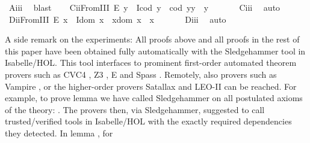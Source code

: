 \begin{isabellebody}
\ A\isactrlsub i\isactrlsub i\isactrlsub i\ \isamarkupfalse%
\ blast%
\endisatagproof
{\isafoldproof}%
%
\isadelimproof
\isanewline
%
\endisadelimproof
\ \ \isamarkupfalse%
\ C\isactrlsub i\isactrlsub iFromIII{\isacharcolon}\ {\isachardoublequoteopen}E\ y\ \isactrlbold {\isasymrightarrow}\ {\isacharparenleft}I{\isacharparenleft}cod\ y{\isacharparenright}\ \isactrlbold {\isasymand}\ {\isacharparenleft}cod\ y{\isacharparenright}{\isasymcdot}y\ {\isasymcong}\ y{\isacharparenright}{\isachardoublequoteclose}\ \isanewline
%
\isadelimproof
\ \ \ \ %
\endisadelimproof
%
\isatagproof
{}\isamarkupfalse%
\ C\isactrlsub i\isactrlsub i\isactrlsub i\ \isamarkupfalse%
\ auto%
\endisatagproof
{\isafoldproof}%
%
\isadelimproof
\isanewline
%
\endisadelimproof
\ \ \isamarkupfalse%
\ D\isactrlsub i\isactrlsub iFromIII{\isacharcolon}\ {\isachardoublequoteopen}E\ x\ \isactrlbold {\isasymrightarrow}\ {\isacharparenleft}I{\isacharparenleft}dom\ x{\isacharparenright}\ \isactrlbold {\isasymand}\ x{\isasymcdot}{\isacharparenleft}dom\ x{\isacharparenright}\ {\isasymcong}\ x{\isacharparenright}{\isachardoublequoteclose}\ \isanewline
%
\isadelimproof
\ \ \ \ %
\endisadelimproof
%
\isatagproof
{}\isamarkupfalse%
\ D\isactrlsub i\isactrlsub i\isactrlsub i\ \isamarkupfalse%
\ auto%
\endisatagproof
{\isafoldproof}%
%
\isadelimproof
%
\endisadelimproof
%
\begin{isamarkuptext}%
A side remark on the experiments: All proofs above and all proofs in the rest of this paper 
 have been obtained fully automatically with the Sledgehammer tool in Isabelle/HOL. This
 tool interfaces to prominent first-order automated theorem provers such as CVC4 \cite{CVC4}, 
 Z3 \cite{Z3}, E \cite{E} and Spass \cite{Spass}. 
 Remotely, also provers such as Vampire \cite{Vampire}, or the higher-order provers 
 Satallax \cite{Satallax} and LEO-II \cite{LEO} 
 can be reached. For example, to prove lemma  we have called Sledgehammer on all 
 postulated axioms of the theory: .  
 The provers then, via Sledgehammer, suggested to call trusted/verified tools in Isabelle/HOL
 with the exactly required dependencies they detected. In lemma , for 

\end{isamarkuptext}
\end{isabellebody}
